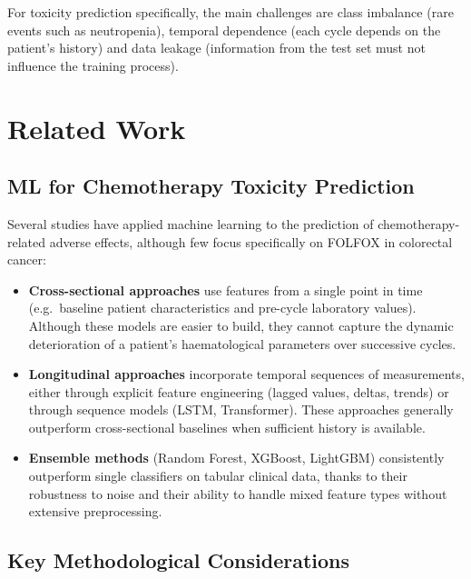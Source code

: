 \documentclass[12pt,a4paper]{report}
\begin{document}
For toxicity prediction specifically, the main challenges are class imbalance (rare events such as neutropenia), temporal dependence (each cycle depends on the patient's history) and data leakage (information from the test set must not influence the training process).

\chapter{Related Work}
\label{chap:related}

\section{ML for Chemotherapy Toxicity Prediction}

Several studies have applied machine learning to the prediction of chemotherapy-related adverse effects, although few focus specifically on FOLFOX in colorectal cancer:

\begin{itemize}
  \item \textbf{Cross-sectional approaches} use features from a single point in time (e.g.\ baseline patient characteristics and pre-cycle laboratory values). Although these models are easier to build, they cannot capture the dynamic deterioration of a patient's haematological parameters over successive cycles.
  \item \textbf{Longitudinal approaches} incorporate temporal sequences of measurements, either through explicit feature engineering (lagged values, deltas, trends) or through sequence models (LSTM, Transformer). These approaches generally outperform cross-sectional baselines when sufficient history is available.
  \item \textbf{Ensemble methods} (Random Forest, XGBoost, LightGBM) consistently outperform single classifiers on tabular clinical data, thanks to their robustness to noise and their ability to handle mixed feature types without extensive preprocessing.
\end{itemize}

\section{Key Methodological Considerations}
\end{document}
